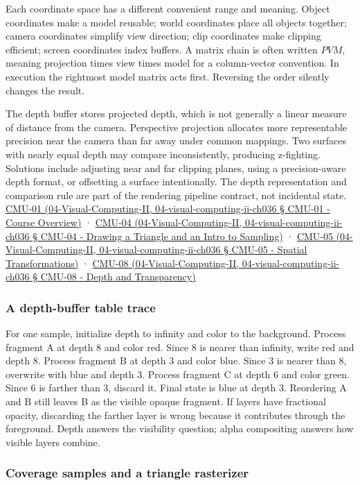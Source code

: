 Each coordinate space has a different convenient range and meaning. Object coordinates make a model reusable; world coordinates place all objects together; camera coordinates simplify view direction; clip coordinates make clipping efficient; screen coordinates index buffers. A matrix chain is often written \(PVM\), meaning projection times view times model for a column-vector convention. In execution the rightmost model matrix acts first. Reversing the order silently changes the result.

The depth buffer stores projected depth, which is not generally a linear measure of distance from the camera. Perspective projection allocates more representable precision near the camera than far away under common mappings. Two surfaces with nearly equal depth may compare inconsistently, producing z-fighting. Solutions include adjusting near and far clipping planes, using a precision-aware depth format, or offsetting a surface intentionally. The depth representation and comparison rule are part of the rendering pipeline contract, not incidental state. \href{}{CMU-01 (04-Visual-Computing-II, 04-visual-computing-ii-ch036 § CMU-01 - Course Overview)} · \href{}{CMU-04 (04-Visual-Computing-II, 04-visual-computing-ii-ch036 § CMU-04 - Drawing a Triangle and an Intro to Sampling)} · \href{}{CMU-05 (04-Visual-Computing-II, 04-visual-computing-ii-ch036 § CMU-05 - Spatial Transformations)} · \href{}{CMU-08 (04-Visual-Computing-II, 04-visual-computing-ii-ch036 § CMU-08 - Depth and Transparency)}

\subsubsection{A depth-buffer table trace}\label{a-depth-buffer-table-trace}

For one sample, initialize depth to infinity and color to the background. Process fragment A at depth 8 and color red. Since 8 is nearer than infinity, write red and depth 8. Process fragment B at depth 3 and color blue. Since 3 is nearer than 8, overwrite with blue and depth 3. Process fragment C at depth 6 and color green. Since 6 is farther than 3, discard it. Final state is blue at depth 3. Reordering A and B still leaves B as the visible opaque fragment. If layers have fractional opacity, discarding the farther layer is wrong because it contributes through the foreground. Depth answers the visibility question; alpha compositing answers how visible layers combine.

\subsubsection{Coverage samples and a triangle rasterizer}\label{coverage-samples-and-a-triangle-rasterizer}

